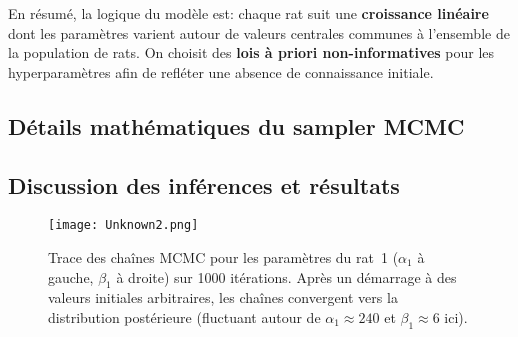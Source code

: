 \documentclass[12pt]{article}
\begin{document}
En r\'esum\'e, la logique du mod\`ele est: chaque rat suit une \textbf{croissance lin\'eaire} dont les param\`etres varient autour de valeurs centrales communes \`a l’ensemble de la population de rats. On choisit des \textbf{lois à priori non-informatives} pour les hyperparam\`etres afin de refl\'eter une absence de connaissance initiale.

\subsection{Détails mathématiques du sampler MCMC}


\subsection{Discussion des inférences et résultats}
 \begin{figure}[h!]
  \centering
  \texttt{[image: Unknown2.png]}
  \caption{Trace des chaînes MCMC pour les paramètres du rat~1 ($\alpha_1$ à gauche, $\beta_1$ à droite) sur 1000 itérations. Après un démarrage à des valeurs initiales arbitraires, les chaînes convergent vers la distribution postérieure (fluctuant autour de $\alpha_1 \approx 240$ et $\beta_1 \approx 6$ ici).}
\end{figure}
\end{document}
